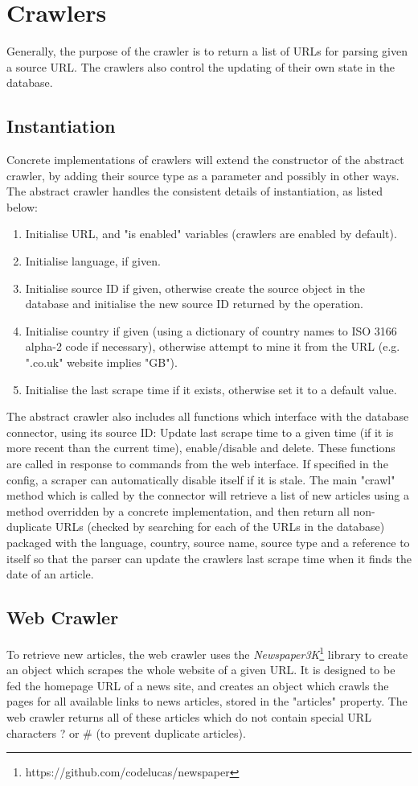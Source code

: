 \documentclass{l4proj}
\begin{document}
\section{Crawlers}
Generally, the purpose of the crawler is to return a list of URLs for parsing given a source URL. The crawlers also control the updating of their own state in the database.

\subsection{Instantiation}
Concrete implementations of crawlers will extend the constructor of the abstract crawler, by adding their source type as a parameter and possibly in other ways. The abstract crawler handles the consistent details of instantiation, as listed below:
\begin{enumerate}
    \item Initialise URL, and "is enabled" variables (crawlers are enabled by default).
    \item Initialise language, if given.
    \item Initialise source ID if given, otherwise create the source object in the database and initialise the new source ID returned by the operation.
    \item Initialise country if given (using a dictionary of country names to ISO 3166 alpha-2 code if necessary), otherwise attempt to mine it from the URL (e.g. ".co.uk" website implies "GB").
    \item Initialise the last scrape time if it exists, otherwise set it to a default value.
\end{enumerate}
The abstract crawler also includes all functions which interface with the database connector, using its source ID: Update last scrape time to a given time (if it is more recent than the current time), enable/disable and delete. These functions are called in response to commands from the web interface. If specified in the config, a scraper can automatically disable itself if it is stale. The main "crawl" method which is called by the connector will retrieve a list of new articles using a method overridden by a concrete implementation, and then return all non-duplicate URLs (checked by searching for each of the URLs in the database) packaged with the language, country, source name, source type and a reference to itself so that the parser can update the crawlers last scrape time when it finds the date of an article.

\subsection{Web Crawler}
To retrieve new articles, the web crawler uses the \emph{Newspaper3K}\footnote{https://github.com/codelucas/newspaper} library to create an object which scrapes the whole website of a given URL. It is designed to be fed the homepage URL of a news site, and creates an object which crawls the pages for all available links to news articles, stored in the "articles" property. The web crawler returns all of these articles which do not contain special URL characters ? or \# (to prevent duplicate articles).
\end{document}
